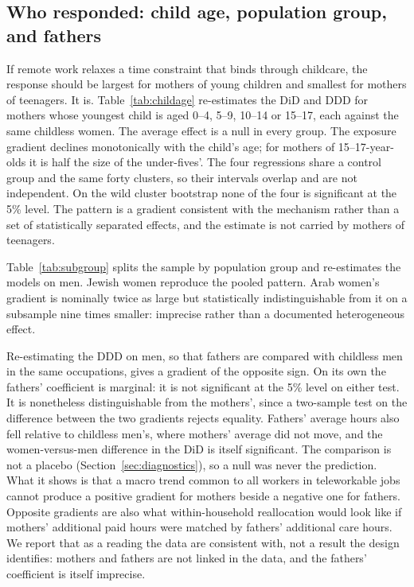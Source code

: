 \documentclass[12pt,a4paper]{article}
\begin{document}
\subsection{Who responded: child age, population group, and fathers}\label{sec:res-childage}

If remote work relaxes a time constraint that binds through childcare, the response should be
largest for mothers of young children and smallest for mothers of teenagers. It is.
Table~\ref{tab:childage} re-estimates the DiD and DDD for mothers whose youngest child is aged
0--4, 5--9, 10--14 or 15--17, each against the same childless women. The average effect is a null
in every group. The exposure gradient declines monotonically with the child's age; for mothers of
15--17-year-olds it is half the size of the under-fives'. The four regressions share a control
group and the same forty clusters, so their intervals overlap and are not independent. On the
wild cluster bootstrap none of the four is significant at the 5\% level. The pattern is a
gradient consistent with the mechanism rather than a set of statistically separated effects, and
the estimate is not carried by mothers of teenagers.

\noindent Table~\ref{tab:subgroup} splits the sample by population group and
re-estimates the models on men. Jewish women reproduce the pooled pattern. Arab women's gradient
is nominally twice as large but statistically indistinguishable from it on a subsample nine times
smaller: imprecise rather than a documented heterogeneous effect.

\noindent Re-estimating the DDD on men, so that fathers are compared with childless men in the same
occupations, gives a gradient of the opposite sign. On its own the
fathers' coefficient is marginal: it is not significant at the 5\% level on either test. It is
nonetheless distinguishable from the mothers', since a two-sample test on the difference between
the two gradients rejects equality. Fathers' average hours also fell relative to childless
men's, where mothers' average did not move, and the women-versus-men difference in the DiD is
itself significant. The comparison is not a placebo (Section~\ref{sec:diagnostics}), so a null
was never the prediction. What it shows is that a macro trend common to all workers in
teleworkable jobs cannot produce a positive gradient for mothers beside a negative one for
fathers. Opposite gradients are also what within-household reallocation would look like if
mothers' additional paid hours were matched by fathers' additional care hours. We report that as
a reading the data are consistent with, not a result the design identifies: mothers and fathers
are not linked in the data, and the fathers' coefficient is itself imprecise.
\end{document}
